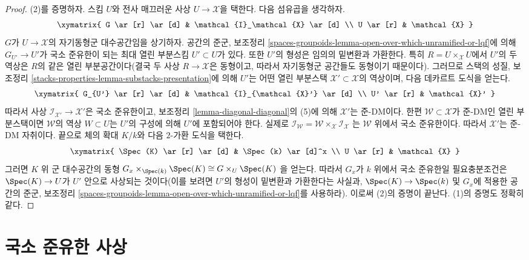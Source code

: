 \begin{proof}
(2)를 증명하자. 스킴 $U$와 전사 매끄러운 사상
$U \to \mathcal{X}$을 택한다. 다음 섬유곱을 생각하자.
$$
\xymatrix{
G \ar[r] \ar[d] & \mathcal{I}_\mathcal{X} \ar[d] \\
U \ar[r] & \mathcal{X}
}
$$
$G$가 $U \to \mathcal{X}$의 자기동형군 대수공간임을 상기하자.
공간의 준군, 보조정리
\ref{spaces-groupoids-lemma-open-over-which-unramified-or-lqf}에 의해
$G_{U'} \to U'$가 국소 준유한이 되는 최대 열린 부분스킴
$U' \subset U$가 있다. 또한 $U'$의 형성은 임의의 밑변환과 가환한다.
특히 $R = U \times_\mathcal{X} U$에서 $U'$의 두 역상은 $R$의 같은
열린 부분공간이다(결국 두 사상 $R \to \mathcal{X}$은 동형이고,
따라서 자기동형군 공간들도 동형이기 때문이다). 그러므로 스택의 성질,
보조정리 \ref{stacks-properties-lemma-substacks-presentation}에 의해
$U'$는 어떤 열린 부분스택 $\mathcal{X}' \subset \mathcal{X}$의
역상이며, 다음 데카르트 도식을 얻는다.
$$
\xymatrix{
G_{U'} \ar[r] \ar[d] & \mathcal{I}_{\mathcal{X}'} \ar[d] \\
U' \ar[r] & \mathcal{X}'
}
$$
따라서 사상 $\mathcal{I}_{\mathcal{X}'} \to \mathcal{X}'$은 국소
준유한이고, 보조정리 \ref{lemma-diagonal-diagonal}의 (5)에 의해
$\mathcal{X}'$는 준-DM이다. 한편
$\mathcal{W} \subset \mathcal{X}$가 준-DM인 열린 부분스택이면
$\mathcal{W}$의 역상 $W \subset U$는 $U'$의 구성에 의해 $U'$에
포함되어야 한다. 실제로
$\mathcal{I}_\mathcal{W} =
\mathcal{W} \times_\mathcal{X} \mathcal{I}_\mathcal{X}$
는 $\mathcal{W}$ 위에서 국소 준유한이다. 따라서 $\mathcal{X}'$는
준-DM 자취이다. 끝으로 체의 확대 $K/k$와 다음 $2$-가환 도식을 택한다.
$$
\xymatrix{
\Spec(K) \ar[r] \ar[d] & \Spec(k) \ar[d]^x \\
U \ar[r] & \mathcal{X}
}
$$
그러면 $K$ 위 군 대수공간의 동형
$G_x \times_{\Spec(k)} \Spec(K) \cong G \times_U \Spec(K)$
을 얻는다. 따라서 $G_x$가 $k$ 위에서 국소 준유한일 필요충분조건은
$\Spec(K) \to U$가 $U'$ 안으로 사상되는 것이다(이를 보려면 $U'$의
형성이 밑변환과 가환한다는 사실과, $\Spec(K) \to \Spec(k)$ 및 $G_x$에
적용한 공간의 준군, 보조정리
\ref{spaces-groupoids-lemma-open-over-which-unramified-or-lqf}를 사용하라).
이로써 (2)의 증명이 끝난다. (1)의 증명도 정확히 같다.
\end{proof}









\section{국소 준유한 사상}
\label{section-locally-quasi-finite}

